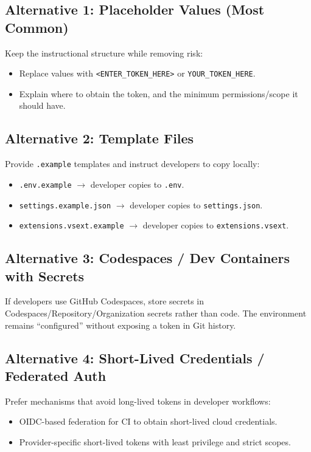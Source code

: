 \documentclass[11pt]{article}
\newcommand{\codeinline}[1]{\texttt{#1}}
\begin{document}
\subsection{Alternative 1: Placeholder Values (Most Common)}
Keep the instructional structure while removing risk:
\begin{itemize}
  \item Replace values with \codeinline{<ENTER\_TOKEN\_HERE>} or \codeinline{YOUR\_TOKEN\_HERE}.
  \item Explain where to obtain the token, and the minimum permissions/scope it should have.
\end{itemize}

\subsection{Alternative 2: Template Files}
Provide \codeinline{.example} templates and instruct developers to copy locally:
\begin{itemize}
  \item \codeinline{.env.example} $\rightarrow$ developer copies to \codeinline{.env}.
  \item \codeinline{settings.example.json} $\rightarrow$ developer copies to \codeinline{settings.json}.
  \item \codeinline{extensions.vsext.example} $\rightarrow$ developer copies to \codeinline{extensions.vsext}.
\end{itemize}

\subsection{Alternative 3: Codespaces / Dev Containers with Secrets}
If developers use GitHub Codespaces, store secrets in Codespaces/Repository/Organization secrets rather than code. The environment remains ``configured'' without exposing a token in Git history.

\subsection{Alternative 4: Short-Lived Credentials / Federated Auth}
Prefer mechanisms that avoid long-lived tokens in developer workflows:
\begin{itemize}
  \item OIDC-based federation for CI to obtain short-lived cloud credentials.
  \item Provider-specific short-lived tokens with least privilege and strict scopes.
\end{itemize}
\end{document}

